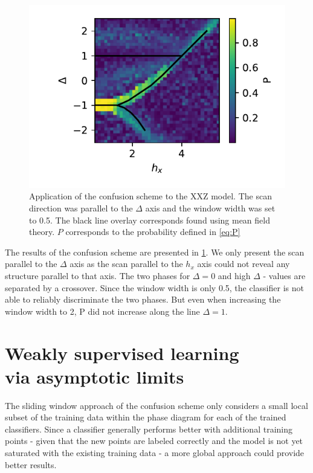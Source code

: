 \documentclass[prl, reprint, twocolumn]{revtex4-1}
\begin{document}
	\begin{figure}[h]
		\includegraphics[width=\columnwidth]{3_5_ConfusionPhaseDiagram2D_1_20181214}
		\caption{Application of the confusion scheme to the XXZ model. The scan direction was parallel to the $\Delta$ axis and the window width was set to 0.5. The black line overlay corresponds found using mean field theory\cite{Dmitriev2002}. $P$ corresponds to the probability defined in \ref{eq:P}}
		\label{fig:confusion}
	\end{figure}
	
	The results of the confusion scheme are presented in \ref{fig:confusion}. We only present the scan parallel to the $\Delta$ axis as the scan parallel to the $h_x$  axis could not reveal any structure parallel to that axis. The two phases for $\Delta = 0$ and high $\Delta$ - values are separated by a crossover. Since the window width is only 0.5, the classifier is not able to reliably discriminate the two phases. But even when increasing the window width to 2, P did not increase along the line $\Delta=1$.
	
	\section{Weakly supervised learning \\ via asymptotic limits}
	The sliding window approach of the confusion scheme only considers a small local subset of the training data within the phase diagram for each of the trained classifiers.
	Since a classifier generally performs better with additional training points - given that the new points are labeled correctly and the model is not yet saturated with the existing training data \cite{}- a more global approach could provide better results.
	
\end{document}
